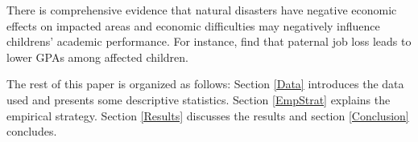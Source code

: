 There is comprehensive evidence that natural disasters have negative economic effects on impacted areas \citep[e.g.][]{Deryugina_2017, Deryugina_2018} and economic difficulties may negatively influence childrens' academic performance. For instance, \cite{Rege_2011} find that paternal job loss leads to lower GPAs among affected children.

The rest of this paper is organized as follows: Section \ref{Data} introduces the data used and presents some descriptive statistics. Section \ref{EmpStrat} explains the empirical strategy. Section \ref{Results} discusses the results and section \ref{Conclusion} concludes.

